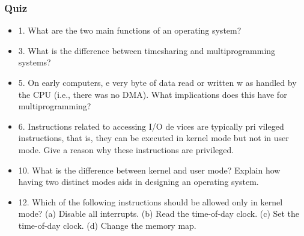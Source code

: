 
\begin{frame}
    \frametitle{Quiz}
    
    \begin{itemize}
        \item
        1. What are the two main functions of an operating system?
        \item
        3. What is the difference between timesharing and multiprogramming systems?
        \item
        5. On early computers, e very byte of data read or written w as handled by the CPU (i.e.,
        there was no DMA). What implications does this have for multiprogramming?
        \item
        6. Instructions related to accessing I/O de vices are typically pri vileged instructions, that
        is, they can be executed in kernel mode but not in user mode. Give a reason why these
        instructions are privileged.
        \item 
        10. What is the difference between kernel and user mode? Explain how having two distinct
        modes aids in designing an operating system.
        \item 
        12. Which of the following instructions should be allowed only in kernel mode?
        (a) Disable all interrupts.
        (b) Read the time-of-day clock.
        (c) Set the time-of-day clock.
        (d) Change the memory map.
    \end{itemize}    

\end{frame}

